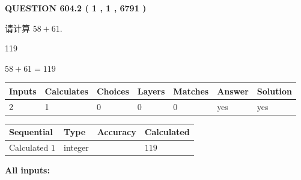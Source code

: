 \documentclass{ctexart}
\begin{document}
   
  
\vspace{0.2in}
  
{\textbf{\Large{QUESTION
604.2 
 ( 1 , 1 , 6791 )
}}}
  
  
 
请计算 $ %
58 +  %
61 $.
 
 
 
\noindent{}
 
 

119
 
 
\noindent{}
 
 

 
 
 
\noindent{}
 
 

$ %
58 +  %
61=   %
119$
 
 
\noindent{}
 
 

 
   
   
   
   
\noindent\begin{tabular}{|l|l|l|l|l|l|l|}
 \hline
Inputs & Calculates & Choices & Layers & Matches & Answer & Solution \\ \hline
 2  & 
 1  & 
 0
  & 
 0  & 
 0  & 
  yes & 
  yes 
  \\ \hline
 \end{tabular}
   
   
   
   
\noindent{}
   
   
  
  
\noindent\begin{tabular}{|l|l|l|l|}
\hline
 Sequential & Type & Accuracy & Calculated \\ 
\hline
 
 
  Calculated $  1 $ & integer &  & 
  $ 119 $ 
 \\  \hline  
 \end{tabular}
   
   
   
   
\noindent\vspace{0.1in}\hspace{-0.08in} {\textbf{\Large{All inputs: }}}
   
\end{document}
